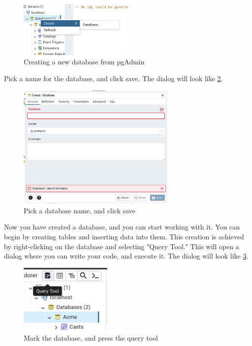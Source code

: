 \begin{figure}[H]
    \centering
    \includegraphics[width=0.5\textwidth]{content/1-relational-databases/figures/pgadmin/6.png}
    \caption{Creating a new database from pgAdmin}
    \label{fig:1.pgadmin6}
\end{figure}

Pick a name for the database, and click save. The dialog will look like \cref{fig:1.pgadmin7}.

\begin{figure}[H]
    \centering
    \includegraphics[width=0.7\textwidth]{content/1-relational-databases/figures/pgadmin/7.png}
    \caption{Pick a database name, and click save}
    \label{fig:1.pgadmin7}
\end{figure}

Now you have created a database, and you can start working with it. You can begin by creating tables and inserting data into them. This creation is achieved by right-clicking on the database and selecting "Query Tool." This will open a dialog where you can write your code, and execute it. The dialog will look like \cref{fig:1.pgadmin8}.

\begin{figure}[H]
    \centering
    \includegraphics[width=0.4\textwidth]{content/1-relational-databases/figures/pgadmin/8.png}
    \caption{Mark the database, and press the query tool}
    \label{fig:1.pgadmin8}
\end{figure}


